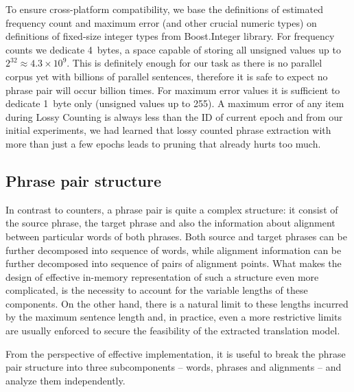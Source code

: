 To ensure cross-platform compatibility, we base the definitions of estimated frequency count and
maximum error (and other crucial numeric types) on definitions of fixed-size integer types from
Boost.Integer library.
For frequency counts we dedicate 4~bytes, a space capable of storing all unsigned values up to
$2^{32} \approx 4.3 \times 10^9$. This is definitely enough for our task as there is no
parallel corpus yet with billions of parallel sentences, therefore it is safe to expect no phrase
pair will occur billion times.
For maximum error values it is sufficient to dedicate 1~byte only (unsigned values up to 255).
A maximum error of any item during Lossy Counting is always less than the ID of current epoch and
from our initial experiments, we had learned that lossy counted phrase extraction with more than just
a few epochs leads to pruning that already hurts too much.

\subsection{Phrase pair structure}


In contrast to counters, a phrase pair is quite a complex structure: it consist of the source phrase,
the target phrase and also the information about alignment between particular words of both phrases.
Both source and target phrases can be further decomposed into sequence of words, while alignment
information can be further decomposed into sequence of pairs of alignment points.
What makes the design of effective in-memory representation of such a structure even more complicated,
is the necessity to account for the variable lengths of these components.
On the other hand, there is a natural limit to these lengths incurred by the maximum sentence length and,
in practice, even a more restrictive limits are usually enforced to secure the feasibility of the
extracted translation model.

From the perspective of effective implementation, it is useful to break the phrase pair
structure into three subcomponents -- words, phrases and alignments -- and analyze them
independently.


